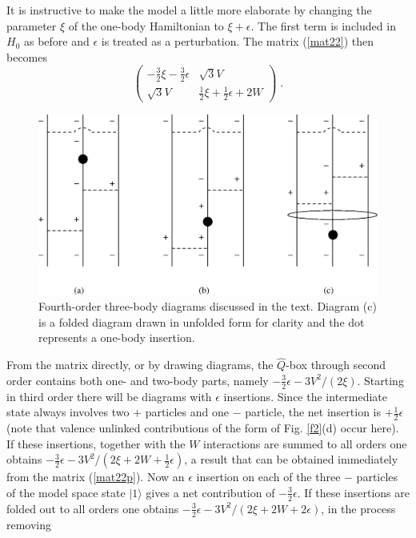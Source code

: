 \documentclass[prc,aps,amsmath,amssymb,preprintnumbers,showpacs,twocolumn]{revtex4}
\def\thalf{{\textstyle{\frac{1}{2}}}}
\def\threehalf{{\textstyle{\frac{3}{2}}}}
\begin{document}
It is instructive to make the model a little more elaborate by changing 
the parameter $\xi$ of the one-body Hamiltonian to $\xi+\epsilon$. The 
first term is included in $H_0$ as before and $\epsilon$ is treated
as a perturbation. The matrix (\ref{mat22}) then becomes
\begin{equation}
\left(\begin{array}{cc}
-\threehalf\xi-\threehalf\epsilon&\sqrt{3}V\\
\sqrt{3}V&\thalf\xi+\thalf\epsilon+2W
\end{array}\right)\;. \label{mat22p}
\end{equation}
%
\begin{figure}[t]
 \includegraphics[width=8truecm]{fig4.eps}
\caption{Fourth-order three-body diagrams discussed in the text. 
Diagram (c) is a folded diagram drawn in unfolded form for clarity
and the dot represents a one-body insertion.} \label{f4}
\end{figure}
%
 From the matrix directly, or by drawing diagrams, the 
$\hat{Q}$-box through second order contains both one- and two-body parts,
namely $-\threehalf\epsilon-3V^2/(2\xi)$. Starting in third order
there will be diagrams with $\epsilon$ insertions. Since the intermediate
state always involves two $+$ particles and one $-$ particle, the net 
insertion is $+\thalf\epsilon$ (note that valence unlinked contributions
of the form of Fig. \ref{f2}(d) occur here). If these insertions, together
with the $W$ interactions are summed to all orders one obtains
$-\threehalf\epsilon-3V^2/(2\xi+2W+\thalf\epsilon)$, a result that can be
obtained immediately from the matrix (\ref{mat22p}). Now an $\epsilon$ 
insertion on each of the three $-$ particles of the model space state 
$|1\rangle$ gives a net contribution of $-\threehalf\epsilon$. If these 
insertions are folded out to all orders one obtains
$-\threehalf\epsilon-3V^2/(2\xi+2W+2\epsilon)$, in the process removing
\end{document}
